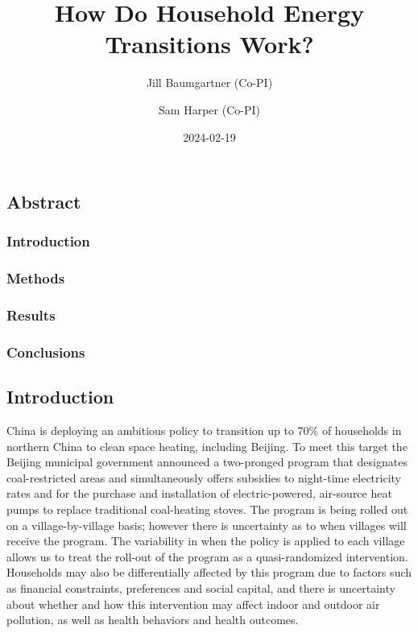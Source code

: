 \documentclass[
  letterpaper,
  DIV=11,
  numbers=noendperiod]{scrartcl}
\title{How Do Household Energy Transitions Work?}
\author{Jill Baumgartner (Co-PI) \and Sam Harper (Co-PI)}
\date{2024-02-19}
\renewcommand*\contentsname{Table of contents}
\newcommand\contentsname{Table of contents}
\begin{document}
\maketitle
\renewcommand*\contentsname{Table of contents}
{
\hypersetup{linkcolor=}
\setcounter{tocdepth}{3}
\tableofcontents
}
\subsection{Abstract}\label{abstract}

\subsubsection{Introduction}\label{introduction}

\subsubsection{Methods}\label{methods}

\subsubsection{Results}\label{results}

\subsubsection{Conclusions}\label{conclusions}

\subsection{Introduction}\label{introduction-1}

China is deploying an ambitious policy to transition up to 70\% of
households in northern China to clean space heating, including Beijing.
To meet this target the Beijing municipal government announced a
two-pronged program that designates coal-restricted areas and
simultaneously offers subsidies to night-time electricity rates and for
the purchase and installation of electric-powered, air-source heat pumps
to replace traditional coal-heating stoves. The program is being rolled
out on a village-by-village basis; however there is uncertainty as to
when villages will receive the program. The variability in when the
policy is applied to each village allows us to treat the roll-out of the
program as a quasi-randomized intervention. Households may also be
differentially affected by this program due to factors such as financial
constraints, preferences and social capital, and there is uncertainty
about whether and how this intervention may affect indoor and outdoor
air pollution, as well as health behaviors and health outcomes.
\end{document}
